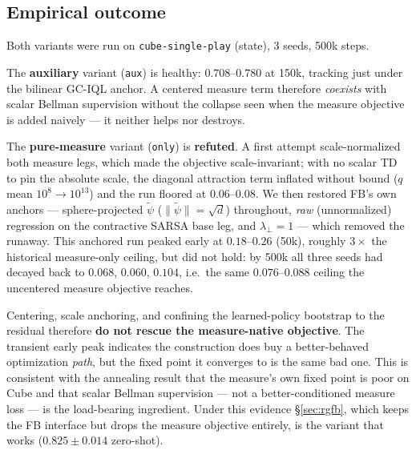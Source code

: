 \documentclass[11pt]{article}
\begin{document}
\subsection{Empirical outcome}
\label{sec:centered-results}

Both variants were run on \texttt{cube-single-play} (state), 3 seeds, 500k steps.

The \textbf{auxiliary} variant (\texttt{aux}) is healthy: $0.708$--$0.780$ at 150k, tracking just
under the bilinear GC-IQL anchor. A centered measure term therefore \emph{coexists} with scalar
Bellman supervision without the collapse seen when the measure objective is added naively --- it
neither helps nor destroys.

The \textbf{pure-measure} variant (\texttt{only}) is \textbf{refuted}. A first attempt scale-normalized
both measure legs, which made the objective scale-invariant; with no scalar TD to pin the absolute
scale, the diagonal attraction term inflated without bound ($q$ mean $10^{8}\!\to\!10^{13}$) and the
run floored at $0.06$--$0.08$. We then restored FB's own anchors --- sphere-projected
$\tilde\psi$ ($\|\tilde\psi\|=\sqrt d$) throughout, \emph{raw} (unnormalized) regression on the
contractive SARSA base leg, and $\lambda_\perp=1$ --- which removed the runaway. This anchored run
peaked early at $0.18$--$0.26$ (50k), roughly $3\times$ the historical measure-only ceiling, but did
not hold: by 500k all three seeds had decayed back to $0.068$, $0.060$, $0.104$, i.e.\ the same
$0.076$--$0.088$ ceiling the uncentered measure objective reaches.

Centering, scale anchoring, and confining the learned-policy bootstrap to the residual therefore
\textbf{do not rescue the measure-native objective}. The transient early peak indicates the
construction does buy a better-behaved optimization \emph{path}, but the fixed point it converges to
is the same bad one. This is consistent with the annealing result that the measure's own fixed point
is poor on Cube and that scalar Bellman supervision --- not a better-conditioned measure loss --- is
the load-bearing ingredient. Under this evidence \S\ref{sec:rgfb}, which keeps the FB interface but
drops the measure objective entirely, is the variant that works ($0.825\pm0.014$ zero-shot).
\end{document}
